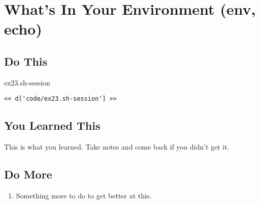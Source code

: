 \chapter{What's In Your Environment (env, echo)}

\section{Do This}

\begin{code}{ex23.sh-session}
\begin{Verbatim}
<< d['code/ex23.sh-session'] >>
\end{Verbatim}
\end{code}


\section{You Learned This}

This is what you learned.  Take notes and come back if you didn't get it.

\section{Do More}

\begin{enumerate}
\item Something more to do to get better at this.
\end{enumerate}


